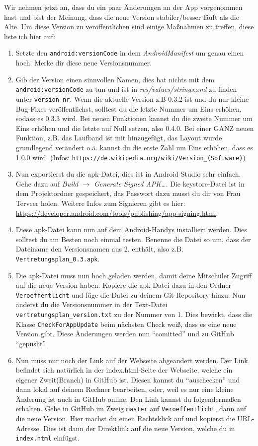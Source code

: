 \documentclass[12pt,headsepline]{scrartcl}
\begin{document}
Wir nehmen jetzt an, dass du ein paar Änderungen an der App vorgenommen hast und bist der Meinung, dass die neue Version stabiler/besser läuft als die Alte.
Um diese Version zu veröffentlichen sind einige Maßnahmen zu treffen, diese liste ich hier auf:
\begin{enumerate}
 \item Setzte den \texttt{android:versionCode} in dem \textit{AndroidManifest} um genau einen hoch. Merke dir diese neue Versionsnummer.
 \item Gib der Version einen sinnvollen Namen, dies hat nichts mit dem \texttt{android:versionCode} zu tun und ist in \textit{res/values/strings.xml} zu finden unter \texttt{version\_nr}. Wenn die aktuelle Version z.B 0.3.2 ist und du nur kleine Bug-Fixes veröffentlichst, solltest du die letzte Nummer um Eins erhöhen, sodass es 0.3.3 wird. Bei neuen Funktionen kannst du die zweite Nummer um Eins erhöhen und die letzte auf Null setzen, also 0.4.0. Bei einer GANZ neuen Funktion, z.B. das Laufband ist mit hinzugefügt, das Layout wurde grundlegend verändert o.ä. kannst du die erste Zahl um Eins erhöhen, dass es 1.0.0 wird. (Infos: \href{https://de.wikipedia.org/wiki/Version_\%28Software\%29}{\texttt{https://de.wikipedia.org/wiki/Version\_(Software)}})
 \item Nun exportierst du die apk-Datei, dies ist in Android Studio sehr einfach. Gehe dazu auf \textit{Build $\rightarrow$ Generate Signed APK\dots}. Die keystore-Datei ist in dem Projektordner gespeichert, das Passwort dazu musst du dir von Frau Terveer holen. Weitere Infos zum Signieren gibt es hier: \url{https://developer.android.com/tools/publishing/app-signing.html}. 
 \item Diese apk-Datei kann nun auf dem Android-Handys installiert werden. Dies solltest du am Besten noch einmal testen. Benenne die Datei so um, dass der Dateiname den Versionsnamen aus 2. enthält, also z.B. \texttt{Vertretungsplan\_0.3.apk}.
 \item Die apk-Datei muss nun hoch geladen werden, damit deine Mitschüler Zugriff auf die neue Version haben. Kopiere die apk-Datei dazu in den Ordner \texttt{Veroeffentlicht} und füge die Datei zu deinem Git-Repository hinzu. Nun änderst du die Versionsnummer in der Text-Datei \texttt{vertretungsplan\_version.txt} zu der Nummer von 1.  Dies bewirkt, dass die Klasse \texttt{CheckForAppUpdate} beim nächsten Check weiß, dass es eine neue Version gibt. Diese Änderungen werden nun ``comitted'' und zu GitHub ``gepusht''.
 \item Nun muss nur noch der Link auf der Webseite abgeändert werden. Der Link befindet sich natürlich in der index.html-Seite der Webseite, welche ein eigener Zweit(Branch) in GitHub ist. Diesen kannst du ``auschecken'' und dann lokal auf deinem Rechner bearbeiten, oder, weil es nur eine kleine Änderung ist auch in GitHub online. Den Link kannst du folgendermaßen erhalten. Gehe in GitHub im Zweig \texttt{master} auf \texttt{Veroeffentlicht}, dann auf die neue Version. Hier machst du einen Rechtsklick auf  und kopierst die URL-Adresse. Dies ist dann der Direktlink auf die neue Version, welche du in \texttt{index.html} einfügst.
 \end{enumerate}
\end{document}
